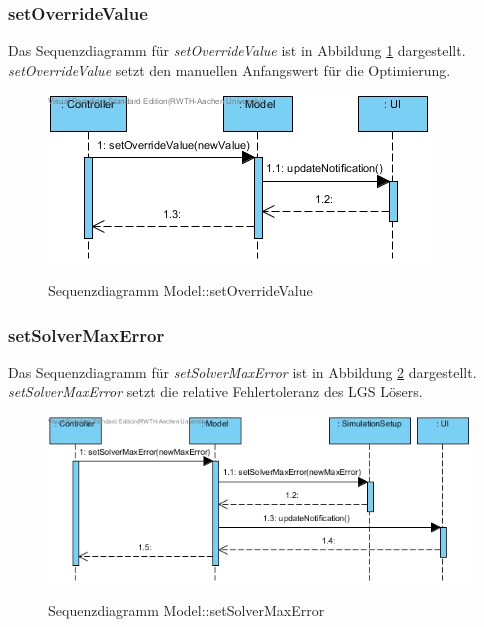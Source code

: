 \subsubsection*{setOverrideValue}

Das Sequenzdiagramm für \emph{setOverrideValue} ist in Abbildung \ref{Sequenzdiagramm Model::setOverrideValue} dargestellt. \emph{setOverrideValue} setzt den manuellen Anfangswert für die Optimierung.

\begin{figure}[H]
	\centering
	\includegraphics[scale=.85]{Bilder/Model__setOverrideValue().jpg}\\
	\caption{Sequenzdiagramm Model::setOverrideValue}
	\label{Sequenzdiagramm Model::setOverrideValue}
\end{figure}

\subsubsection*{setSolverMaxError}

Das Sequenzdiagramm für \emph{setSolverMaxError} ist in Abbildung \ref{Sequenzdiagramm Model::setSolverMaxError} dargestellt. \emph{setSolverMaxError} setzt die relative Fehlertoleranz des LGS Lösers.

\begin{figure}[H]
	\centering
	\includegraphics[scale=.85]{Bilder/Model__setSolverMaxError().jpg}\\
	\caption{Sequenzdiagramm Model::setSolverMaxError}
	\label{Sequenzdiagramm Model::setSolverMaxError}
\end{figure}

